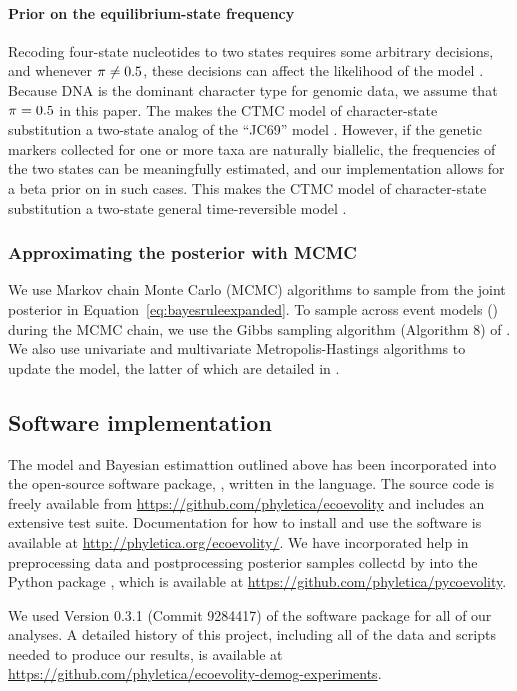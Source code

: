 \paragraph{Prior on the equilibrium-state frequency}
Recoding four-state nucleotides to two states requires some arbitrary
decisions, and whenever $\pi_{} \neq 0.5$, these decisions can affect
the likelihood of the model \citep{Oaks2018ecoevolity}.
Because DNA is the dominant character type for genomic data, we assume that
$\pi_{} = 0.5$ in this paper.
The makes the CTMC model of character-state substitution a two-state analog of
the ``JC69'' model \citep{JC1969}.
However, if the genetic markers collected for one or more taxa are  naturally
biallelic, the frequencies of the two states can be meaningfully estimated, and
our implementation allows for a beta prior on \gfreq in such cases.
This makes the CTMC model of character-state substitution a two-state general
time-reversible model \citep{Tavare1986}.

\subsubsection{Approximating the posterior with MCMC}

We use Markov chain Monte Carlo (MCMC) algorithms to sample from the joint
posterior in Equation~\ref{eq:bayesruleexpanded}.
To sample across event models (\etimesets) during the MCMC chain, we use the
Gibbs sampling algorithm (Algorithm 8) of \citet{Neal2000}.
We also use univariate and multivariate Metropolis-Hastings algorithms
\citep{Metropolis1953,Hastings1970} to update the model,
the latter of which are detailed in \citet{Oaks2018ecoevolity}.

\subsection{Software implementation}
The model and Bayesian estimattion outlined above has been incorporated into
the open-source software package, \ecoevolity, written in the \cpp language.
The source code is freely available from
\url{https://github.com/phyletica/ecoevolity} and
includes an extensive test suite.
Documentation for how to install and use the software is available at
\url{http://phyletica.org/ecoevolity/}.
We have incorporated help in preprocessing data and postprocessing posterior
samples collectd by \ecoevolity into the Python package \pycoevolity, which is
available at
\url{https://github.com/phyletica/pycoevolity}.

We used Version 0.3.1 
(Commit 9284417)
of the \ecoevolity software package for all of our analyses.
A detailed history of this project, including all of the data and scripts
needed to produce our results, is available at
\url{https://github.com/phyletica/ecoevolity-demog-experiments}.
